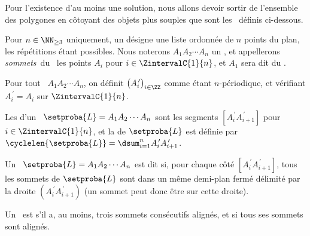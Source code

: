 Pour l'existence d'au moins une solution, nous allons devoir sortir de l'ensemble des polygones en côtoyant des objets plus souples que sont les \ncycles\ définis ci-dessous.




\begin{defi}
	Pour $n \in \NN_{\geq3}$ uniquement, un \onedef{\ncycle} désigne une liste ordonnée de $n$ points du plan, les répétitions étant possibles.
	Nous noterons $A_1 A_2 \cdots A_n$ un \ncycle, 
	et appellerons 
	\og \emph{sommets}\fg\ du \ncycle\ les points $A_i$ pour $i \in \ZintervalC{1}{n}$,
	et $A_1$ sera dit  du \ncycle.
\end{defi}


\begin{defi}
    Pour tout \ncycle\ $A_1 A_2 \cdots A_n$, on définit $\big( A^{\,\prime}_i \big)_{i \in \ZZ}$ comme étant $n$-périodique, et vérifiant $A^{\,\prime}_{i} = A_i$ sur $\ZintervalC{1}{n}$.
\end{defi}


\begin{defi}
	Les  d'un \ncycle\ $\setproba{L} = A_1 A_2 \cdots A_n$ sont les segments
	$[A^{\,\prime}_i A^{\,\prime}_{i+1}]$ pour $i \in \ZintervalC{1}{n}$,
	et
	la  de $\setproba{L}$ est définie par $\cyclelen{\setproba{L}} = \dsum_{i=1}^{n} A^{\,\prime}_i A^{\,\prime}_{i+1}$.
\end{defi}


\begin{defi}
	Un \ncycle\ $\setproba{L} = A_1 A_2 \cdots A_n$ est dit  si, pour chaque côté $[A^{\,\prime}_i A^{\,\prime}_{i+1}]$, tous les sommets de $\setproba{L}$ sont dans un même demi-plan fermé délimité par la droite $(A^{\,\prime}_i A^{\,\prime}_{i+1})$ (un sommet peut donc être sur cette droite).
\end{defi}


\begin{defi}
	Un \ncycle\ est  s'il a, au moins, trois sommets consécutifs alignés,
	et
	 si tous ses sommets sont alignés.
\end{defi}


